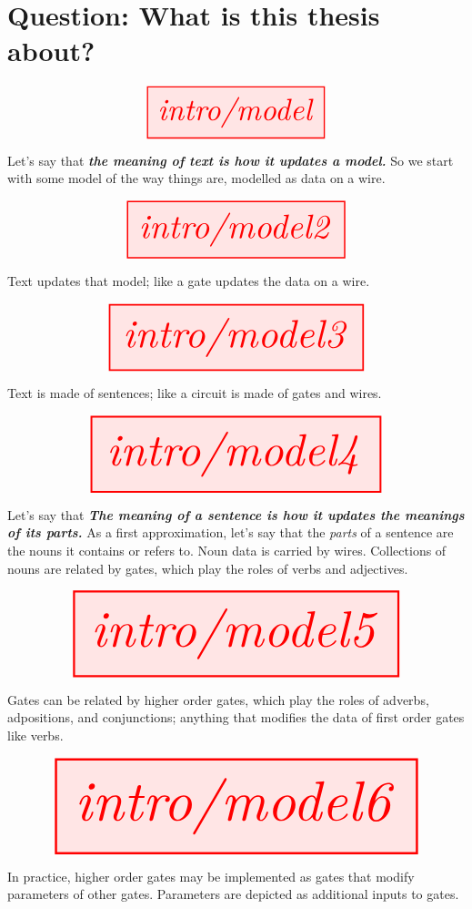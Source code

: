 \section{\textbf{Question:} What is this thesis about?}

\begin{marginfigure}
\centering
\[\resizebox{0.5\textwidth}{!}{\tikzfig{intro/model}}\]
\caption{Let's say that \textbf\emph{{the meaning of text is how it updates a model.}} So we start with some model of the way things are, modelled as data on a wire.}
\end{marginfigure}

\begin{marginfigure}
\centering
\[\resizebox{0.6\textwidth}{!}{\tikzfig{intro/model2}}\]
\caption{Text updates that model; like a gate updates the data on a wire.}
\end{marginfigure}

\begin{marginfigure}
\centering
\[\resizebox{0.7\textwidth}{!}{\tikzfig{intro/model3}}\]
\caption{Text is made of sentences; like a circuit is made of gates and wires.}
\end{marginfigure}

\begin{marginfigure}
\centering
\[\resizebox{0.8\textwidth}{!}{\tikzfig{intro/model4}}\]
\caption{Let's say that \textbf{\emph{The meaning of a sentence is how it updates the meanings of its parts.}} As a first approximation, let's say that the \emph{parts} of a sentence are the nouns it contains or refers to. Noun data is carried by wires. Collections of nouns are related by gates, which play the roles of verbs and adjectives.}
\end{marginfigure}

\begin{marginfigure}
\centering
\[\resizebox{0.9\textwidth}{!}{\tikzfig{intro/model5}}\]
\caption{Gates can be related by higher order gates, which play the roles of adverbs, adpositions, and conjunctions; anything that modifies the data of first order gates like verbs.}
\end{marginfigure}

\begin{marginfigure}
\centering
\[\resizebox{\textwidth}{!}{\tikzfig{intro/model6}}\]
\caption{In practice, higher order gates may be implemented as gates that modify parameters of other gates. Parameters are depicted as additional inputs to gates.}
\end{marginfigure}

